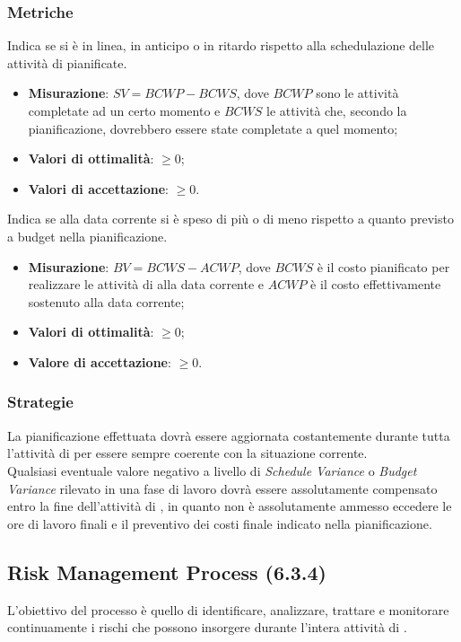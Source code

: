 \subsubsection{Metriche}
\label{scheduleVariance}
Indica se si è in linea, in anticipo o in ritardo rispetto alla schedulazione delle attività di  pianificate.
\begin{itemize}
\item \textbf{Misurazione}: $SV = BCWP - BCWS$, dove $BCWP$ sono le attività completate ad un certo momento e $BCWS$ le attività che, secondo la pianificazione, dovrebbero essere state completate a quel momento;
\item \textbf{Valori di ottimalità}: $\geq 0$;
\item \textbf{Valori di accettazione}: $\geq 0$.
\end{itemize}
\label{budgetVariance}
Indica se alla data corrente si è speso di più o di meno rispetto a quanto previsto a budget nella pianificazione.
\begin{itemize}
\item \textbf{Misurazione}: $BV = BCWS - ACWP$, dove $BCWS$ è il costo pianificato per realizzare le attività di  alla data corrente e $ACWP$ è il costo effettivamente sostenuto alla data corrente;
\item \textbf{Valori di ottimalità}: $\geq 0$;
\item \textbf{Valore di accettazione}: $\geq 0$.
\end{itemize}
\subsubsection{Strategie}
La pianificazione effettuata dovrà essere aggiornata costantemente durante tutta l'attività di  per essere sempre coerente con la situazione corrente.\\
Qualsiasi eventuale valore negativo a livello di \textit{Schedule Variance} o  \textit{Budget Variance} rilevato in una fase di lavoro dovrà essere assolutamente compensato entro la fine dell'attività di , in quanto non è assolutamente ammesso eccedere le ore di lavoro finali e il preventivo dei costi finale indicato nella pianificazione.
\subsection{Risk Management Process (6.3.4)}
\label{riskMgmt}
L'obiettivo del processo è quello di identificare, analizzare, trattare e monitorare continuamente i rischi che possono insorgere durante l'intera attività di .
